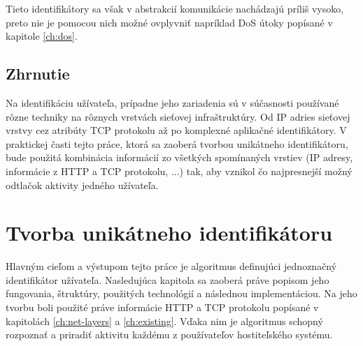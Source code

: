 \documentclass[
  printed, %
  table,   %
  lof,     %
  lot,     %
]{fithesis3}
\begin{document}
Tieto identifikátory sa však v abstrakcií komunikácie nachádzajú príliš vysoko,
preto nie je pomocou nich možné ovplyvniť napríklad DoS útoky popísané v
kapitole \ref{ch:dos}.

\section{Zhrnutie}
Na identifikáciu užívateľa, prípadne jeho zariadenia sú v súčasnosti
používané rôzne techniky na rôznych vrstvách sieťovej infraštruktúry. Od IP
adries sieťovej vrstvy cez atribúty TCP protokolu až po komplexné aplikačné
identifikátory. V praktickej časti tejto práce, ktorá sa zaoberá tvorbou
unikátneho identifikátoru, bude použitá kombinácia informácií zo všetkých
spomínaných vrstiev (IP adresy, informácie z HTTP a TCP protokolu, ...) tak,
aby vznikol čo najpresnejší možný odtlačok aktivity jedného užívateľa.

\chapter{Tvorba unikátneho identifikátoru}
\label{ch:footprint}
Hlavným cieľom a výstupom tejto práce je algoritmus definujúci jednoznačný
identifikátor užívateľa. Nasledujúca kapitola sa zaoberá práve popisom jeho
fungovania, štruktúry, použitých technológií a následnou implementáciou. Na
jeho tvorbu boli použité práve informácie HTTP a TCP protokolu popísané v
kapitolách \ref{ch:net-layers} a \ref{ch:existing}. Vďaka nim je algoritmus
schopný rozpoznať a priradiť aktivitu každému z používateľov hostiteľského
systému.
\end{document}
